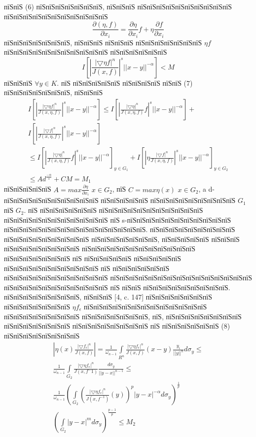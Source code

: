 \documentclass[a5paper, 12pt, openbib]{report}
\begin{document}
пїЅпїЅ (6) пїЅпїЅпїЅпїЅпїЅпїЅпїЅ, пїЅпїЅпїЅ пїЅпїЅпїЅпїЅпїЅпїЅпїЅпїЅпїЅпїЅ пїЅпїЅпїЅпїЅпїЅпїЅпїЅпїЅпїЅпїЅпїЅ
\begin{equation}
\frac{\partial(\eta,f)}{\partial x_i}=\frac{\partial\eta}{\partial x_i}f+\eta\frac{\partial f}{\partial x_i}
\end{equation}
пїЅпїЅпїЅпїЅпїЅпїЅпїЅ, пїЅпїЅпїЅ пїЅпїЅпїЅ пїЅпїЅпїЅпїЅпїЅпїЅпїЅ $\eta f$ пїЅпїЅпїЅпїЅпїЅпїЅпїЅпїЅпїЅпїЅпїЅ пїЅпїЅпїЅпїЅпїЅпїЅ
$$
I\left[\left|\frac{|\bigtriangledown\eta f|^{n}}{J(x,f)}
\right|^{s}||x-y||^{-\alpha}\right]<M
$$
пїЅпїЅпїЅ $\forall y\in K$. пїЅ пїЅпїЅпїЅпїЅпїЅ пїЅпїЅпїЅпїЅ пїЅпїЅ (7) пїЅпїЅпїЅпїЅпїЅпїЅпїЅ, пїЅпїЅпїЅ 
\begin{multline}
I\left[\left|\frac{|\bigtriangledown\eta f|^{n}}{J(x,\eta,f)}
\right|^{s}||x-y||^{-\alpha}\right]\leq I\left[\left|\frac{|\bigtriangledown\eta|^{n}}{J(x,\eta,f)}f
\right|^{s}||x-y||^{-\alpha}\right]+\\I\left[\left|\frac{|\bigtriangledown f|^{n}}{J(x,\eta,f)}
\right|^{s}||x-y||^{-\alpha}\right]
\\
\leq I\left[\left|\frac{|\bigtriangledown\eta|^{n}}{J(x,\eta,f)}f
\right|^{s}||x-y||^{-\alpha}\right]_{y\in G_1}+I\left[\left|\eta\frac{|\bigtriangledown f|^{n}}{J(x,\eta,f)}
\right|^{s}||x-y||^{-\alpha}\right]_{y\in G_2}\\\leq Ad^{\frac{-\alpha}{s}}+CM=M_1
\end{multline}
пїЅпїЅпїЅпїЅпїЅ $A=max\frac{\partial\eta}{\partial x_i}$ $x\in G_2$, пїЅ $C=max\eta(x)$ $x\in G_2$, a d-пїЅпїЅпїЅпїЅпїЅпїЅпїЅпїЅпїЅпїЅ пїЅпїЅпїЅпїЅпїЅ пїЅпїЅпїЅпїЅпїЅпїЅпїЅпїЅпїЅ $G_1$  пїЅ $G_2$. пїЅ пїЅпїЅпїЅпїЅпїЅпїЅ пїЅпїЅпїЅпїЅпїЅпїЅпїЅпїЅпїЅпїЅпїЅ пїЅпїЅпїЅпїЅпїЅпїЅпїЅпїЅпїЅпїЅпїЅ пїЅ s-пїЅпїЅпїЅпїЅпїЅпїЅпїЅпїЅпїЅпїЅпїЅ пїЅпїЅпїЅпїЅпїЅпїЅпїЅпїЅпїЅпїЅпїЅпїЅпїЅпїЅпїЅ. пїЅпїЅпїЅпїЅпїЅпїЅпїЅпїЅпїЅ пїЅпїЅпїЅпїЅпїЅпїЅпїЅпїЅпїЅ пїЅпїЅпїЅпїЅпїЅпїЅпїЅ, пїЅпїЅпїЅпїЅпїЅ   пїЅпїЅпїЅ пїЅпїЅпїЅпїЅпїЅпїЅпїЅпїЅ пїЅпїЅпїЅпїЅпїЅпїЅпїЅпїЅпїЅпїЅпїЅпїЅ пїЅпїЅпїЅпїЅпїЅпїЅпїЅ пїЅ пїЅпїЅпїЅпїЅпїЅ пїЅпїЅпїЅпїЅпїЅ пїЅпїЅпїЅпїЅпїЅпїЅпїЅпїЅпїЅпїЅ пїЅ пїЅпїЅпїЅпїЅпїЅпїЅ пїЅпїЅпїЅпїЅпїЅпїЅпїЅпїЅпїЅпїЅпїЅ пїЅпїЅпїЅпїЅпїЅпїЅпїЅпїЅпїЅпїЅпїЅпїЅпїЅпїЅпїЅ пїЅпїЅпїЅпїЅпїЅпїЅпїЅпїЅпїЅпїЅпїЅ пїЅ пїЅпїЅ пїЅпїЅпїЅпїЅпїЅпїЅпїЅпїЅпїЅ.
 пїЅпїЅпїЅпїЅпїЅпїЅпїЅпїЅ, пїЅпїЅпїЅ [4, c. 147] пїЅпїЅпїЅпїЅпїЅпїЅпїЅ пїЅпїЅпїЅпїЅпїЅпїЅпїЅ $\eta f_\epsilon$ пїЅпїЅпїЅпїЅпїЅпїЅпїЅпїЅпїЅпїЅпїЅпїЅпїЅ пїЅпїЅпїЅпїЅпїЅпїЅпїЅпїЅ пїЅпїЅпїЅпїЅпїЅпїЅпїЅ, пїЅ, пїЅпїЅпїЅпїЅпїЅпїЅпїЅпїЅ пїЅпїЅпїЅпїЅпїЅпїЅпїЅ пїЅпїЅпїЅпїЅпїЅпїЅпїЅпїЅ пїЅ пїЅпїЅпїЅпїЅпїЅпїЅ (8)  пїЅпїЅпїЅпїЅпїЅпїЅпїЅпїЅ
 \begin{multline}
 \left|\eta(x)\frac{|\bigtriangledown f_\epsilon|^n}{J(x,f)}\right|=\frac{1}{\omega_{n-1}}\int\limits_{R^n}\frac{|\bigtriangledown\eta f_\epsilon|^n}{J(x,f)}(x-y)\frac{y_i}{||y||^n}d\sigma_{y}\leq
 \\
 \frac{1}{\omega_{n-1}}\int\limits_{G_2}\frac{|\bigtriangledown\eta f_\epsilon|^n}{J(x,f^-1)}\frac{d\sigma_{y}}{||y-x||^{n-1}}\leq
 \\
 \frac{1}{\omega_{n-1}}\left(\int\limits_{G_2}\left(\frac{|\bigtriangledown\eta f_\epsilon|^n}{J(x,f^{-1})}(y)\right)^p |y-x|^{-\alpha}d\sigma_y\right)^{\frac{1}{p}}\\\left(\int\limits_{G_2}|y-x|^{m}d\sigma_y\right)^{\frac{p-1}{p}}\leq M_2
\end{multline}
\end{document}
